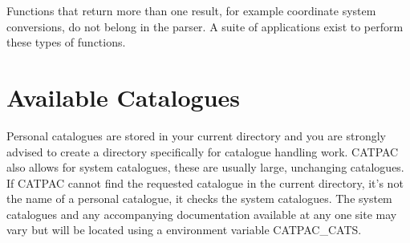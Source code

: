 Functions that return more than one result, for example coordinate system
conversions, do not belong in the parser. A suite of applications exist
to perform these types of functions.

\section{Available Catalogues}
\label{ap:cats}
 
Personal catalogues are stored in your current directory and you are strongly 
advised to create a directory specifically for catalogue handling work. CATPAC
also allows for system catalogues, these are usually large, unchanging 
catalogues. If CATPAC cannot find the requested catalogue in the current 
directory, it's not the name of a personal catalogue, it checks the system
catalogues. The system catalogues and any accompanying documentation available
at any one site may vary but will be located using a environment variable 
CATPAC\_CATS.


